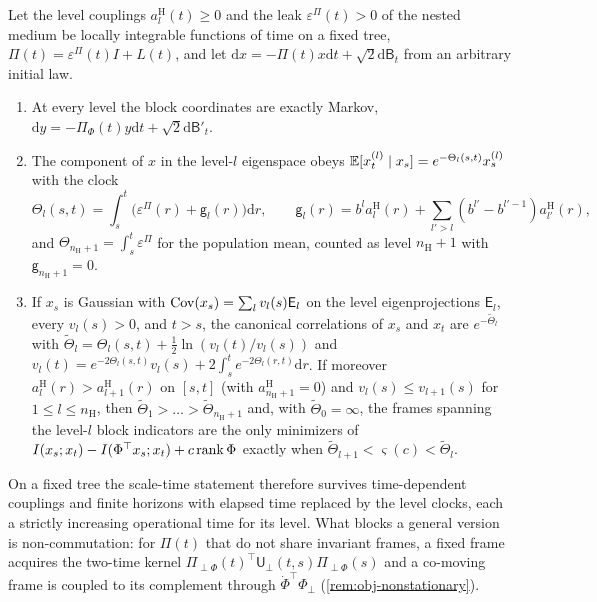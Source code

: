 \begin{proposition}\label{prop:obj-clocks}
Let the level couplings $a^{\mathrm H}_l(t)\ge0$ and the leak $\varepsilon^\Pi(t)>0$ of the nested medium be locally integrable functions of time on a fixed tree, $\Pi(t)=\varepsilon^\Pi(t)I+L(t)$, and let $\mathrm dx=-\Pi(t)x\mathrm dt+\sqrt2\mathrm d\mathsf B_t$ from an arbitrary initial law.
\begin{enumerate}
\item[(a)] At every level the block coordinates are exactly Markov, $\mathrm dy=-\Pi_\Phi(t)y\mathrm dt+\sqrt2\mathrm d\mathsf B'_t$.
\item[(b)] The component of $x$ in the level-$l$ eigenspace obeys $\mathbb{E}[x^{(l)}_t\mid x_s]=e^{-\Theta_l(s,t)}x^{(l)}_s$ with the clock
\begin{equation}\label{eq:obj-clock}
\Theta_l(s,t)=\int_s^t\bigl(\varepsilon^\Pi(r)+\mathsf g_l(r)\bigr)\mathrm dr,\qquad\mathsf g_l(r)=b^la^{\mathrm H}_l(r)+\sum_{l'>l}(b^{l'}-b^{l'-1})a^{\mathrm H}_{l'}(r),
\end{equation}
and $\Theta_{n_{\mathrm H}+1}=\int_s^t\varepsilon^\Pi$ for the population mean, counted as level $n_{\mathrm H}+1$ with $\mathsf g_{n_{\mathrm H}+1}=0$.
\item[(c)] If $x_s$ is Gaussian with $\operatorname{Cov}(x_s)=\sum_lv_l(s)\mathsf E_l$ on the level eigenprojections $\mathsf E_l$, every $v_l(s)>0$, and $t>s$, the canonical correlations of $x_s$ and $x_t$ are $e^{-\tilde\Theta_l}$ with $\tilde\Theta_l=\Theta_l(s,t)+\frac12\ln(v_l(t)/v_l(s))$ and $v_l(t)=e^{-2\Theta_l(s,t)}v_l(s)+2\int_s^te^{-2\Theta_l(r,t)}\mathrm dr$. If moreover $a^{\mathrm H}_l(r)>a^{\mathrm H}_{l+1}(r)$ on $[s,t]$ (with $a^{\mathrm H}_{n_{\mathrm H}+1}=0$) and $v_l(s)\le v_{l+1}(s)$ for $1\le l\le n_{\mathrm H}$, then $\tilde\Theta_1>\dots>\tilde\Theta_{n_{\mathrm H}+1}$ and, with $\tilde\Theta_0=\infty$, the frames spanning the level-$l$ block indicators are the only minimizers of $I(x_s;x_t)-I(\Phi^\top x_s;x_t)+c\operatorname{rank}\Phi$ exactly when $\tilde\Theta_{l+1}<\varsigma(c)<\tilde\Theta_l$.
\end{enumerate}
\end{proposition}

On a fixed tree the scale-time statement therefore survives time-dependent couplings and finite horizons with elapsed time replaced by the level clocks, each a strictly increasing operational time for its level. What blocks a general version is non-commutation: for $\Pi(t)$ that do not share invariant frames, a fixed frame acquires the two-time kernel $\Pi_{\perp\Phi}(t)^\top\mathsf U_\perp(t,s)\Pi_{\perp\Phi}(s)$ and a co-moving frame is coupled to its complement through $\dot\Phi^\top\Phi_\perp$ (\cref{rem:obj-nonstationary}).

